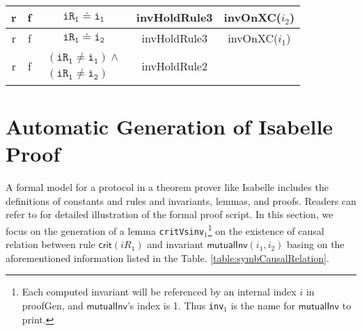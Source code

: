 \documentclass[conference]{IEEEtran}
\def \eqc {\doteq }
\def \iInv {i}
\def \iR {iR}
\begin{document}
{\begin{table}[htbp]
\begin{tabular}{|c|c|c|c|c|  }
  r& f& $\mathtt{\iR_1} \eqc \mathtt{\iInv_1}$ & invHoldRule3 &invOnXC($\iInv_2$) \\
\hline
  r &f& $\mathtt{\iR_1} \eqc \mathtt{\iInv_2}$ & invHoldRule3 &invOnXC($\iInv_1$)  \\
\hline
   r & f & $\left.
\begin{array}{c}
(\mathtt{\iR_1} \ne \mathtt{\iInv_1})\wedge \\
(\mathtt{\iR_1} \ne \mathtt{\iInv_2})
\end{array}%
\right. $ &invHoldRule2  & \\
\hline

\end{tabular}
\end{table}
\vspace{-10pt}

\section{Automatic Generation of Isabelle Proof }
\vspace{-5pt}
A formal model for a protocol  in a theorem prover like Isabelle
includes the definitions of constants and rules and invariants,
lemmas, and proofs. Readers can refer to \cite{LiCache16} for detailed illustration of the formal proof script. In this section, we focus on the generation of a lemma {\tt critVsinv$_1$}\footnote{Each computed invariant will be referenced by an internal index $i$ in {\sf proofGen}, and $\mathsf{mutualInv}$'s index is 1. Thus {\tt inv$_1$} is the  name for $\mathsf{mutualInv}$ to print.} on the existence of causal relation between rule $\mathsf{crit}(\iR_1)$ and invariant $\mathsf{mutualInv}(\iInv_1,\iInv_2)$  basing on the aforementioned information listed in the Table. \ref{table:symbCausalRelation}. %






}
\end{document}
